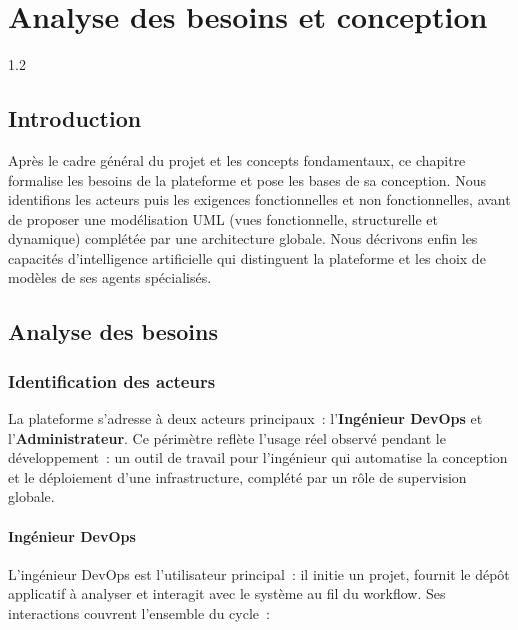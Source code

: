 \chapter{Analyse des besoins et conception}
\begin{spacing}{1.2}
\minitoc
\thispagestyle{MyStyle}
\end{spacing}
\clearpage

\section{Introduction}

Après le cadre général du projet et les concepts fondamentaux, ce chapitre formalise les
besoins de la plateforme et pose les bases de sa conception. Nous identifions les acteurs
puis les exigences fonctionnelles et non fonctionnelles, avant de proposer une
modélisation UML (vues fonctionnelle, structurelle et dynamique) complétée par une
architecture globale. Nous décrivons enfin les capacités d'intelligence artificielle qui
distinguent la plateforme et les choix de modèles de ses agents spécialisés.

\section{Analyse des besoins}

\subsection{Identification des acteurs}

La plateforme s'adresse à deux acteurs principaux~: l'\textbf{Ingénieur DevOps} et
l'\textbf{Administrateur}. Ce périmètre reflète l'usage réel observé pendant le
développement~: un outil de travail pour l'ingénieur qui automatise la conception et le
déploiement d'une infrastructure, complété par un rôle de supervision globale.

\subsubsection{Ingénieur DevOps}

L'ingénieur DevOps est l'utilisateur principal~: il initie un projet, fournit le dépôt
applicatif à analyser et interagit avec le système au fil du workflow. Ses interactions
couvrent l'ensemble du cycle~:

